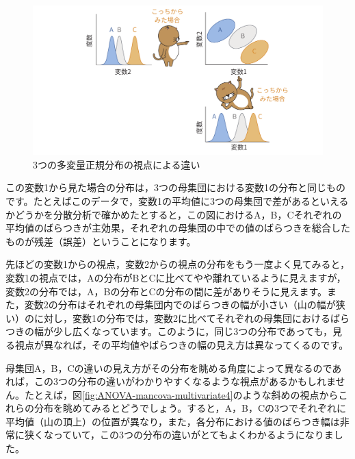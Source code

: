 \documentclass[
  12pt,
  a5jpaper,
  lualatex, ja=standard]{bxjsbook}
\begin{document}
\begin{figure}[!ht]

{\centering \includegraphics[width=1\linewidth]{images/ANOVA/mancova-multivariate3} 

}

\caption{3つの多変量正規分布の視点による違い}\label{fig:ANOVA-mancova-multivariate3}
\end{figure}

この変数1から見た場合の分布は，3つの母集団における変数1の分布と同じものです。たとえばこのデータで，変数1の平均値に3つの母集団で差があるといえるかどうかを分散分析で確かめたとすると，この図におけるA，B，Cそれぞれの平均値のばらつきが主効果，それぞれの母集団の中での値のばらつきを総合したものが残差（誤差）ということになります。

先ほどの変数1からの視点，変数2からの視点の分布をもう一度よく見てみると，変数1の視点では，Aの分布がBとCに比べてやや離れているように見えますが，変数2の分布では，A，Bの分布とCの分布の間に差がありそうに見えます。また，変数2の分布はそれぞれの母集団内でのばらつきの幅が小さい（山の幅が狭い）のに対し，変数1の分布では，変数2に比べてそれぞれの母集団におけるばらつきの幅が少し広くなっています。このように，同じ3つの分布であっても，見る視点が異なれば，その平均値やばらつきの幅の見え方は異なってくるのです。

母集団A，B，Cの違いの見え方がその分布を眺める角度によって異なるのであれば，この3つの分布の違いがわかりやすくなるような視点があるかもしれません。たとえば，図\ref{fig:ANOVA-mancova-multivariate4}のような斜めの視点からこれらの分布を眺めてみるとどうでしょう。すると，A，B，Cの3つでそれぞれに平均値（山の頂上）の位置が異なり，また，各分布における値のばらつき幅は非常に狭くなっていて，この3つの分布の違いがとてもよくわかるようになりました。
\end{document}
